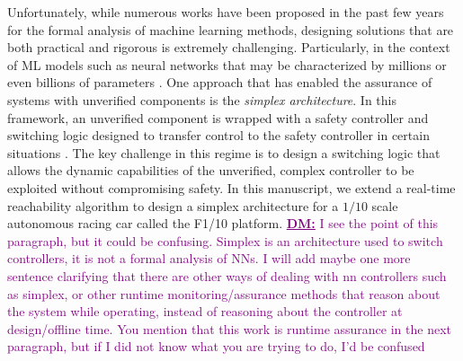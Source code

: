 \documentclass[manuscript,screen,review]{acmart}
\newcommand{\diego}[1]{\textcolor{purple}{\textbf{\underline{DM:}} #1}}
\begin{document}

Unfortunately, while numerous works have been proposed in the past few years for the formal analysis of machine learning methods, designing solutions that are both practical and rigorous is extremely challenging. Particularly, in the context of ML models such as neural networks that may be characterized by millions or even billions of parameters \cite{BallesterGoogLeNet,SimonyanVeryDeep}. One approach that has enabled the assurance of systems with unverified components is the \textit{simplex architecture}. In this framework, an unverified component is wrapped with a safety controller and switching logic designed to transfer control to the safety controller in certain situations \cite{Bak2014}. The key challenge in this regime is to design a switching logic that allows the dynamic capabilities of the unverified, complex controller to be exploited without compromising safety. In this manuscript, we extend a real-time reachability algorithm \cite{Bak2014,Johnson2016} to design a simplex architecture for a $1/10$ scale autonomous racing car called the F1/10 platform. \diego{I see the point of this paragraph, but it could be confusing. Simplex is an architecture used to switch controllers, it is not a formal analysis of NNs. I will add maybe one more sentence clarifying that there are other ways of dealing with nn controllers such as simplex, or other runtime monitoring/assurance methods that reason about the system while operating, instead of reasoning about the controller at design/offline time. You mention that this work is runtime assurance in the next paragraph, but if I did not know what you are trying to do, I'd be confused}
\end{document}

